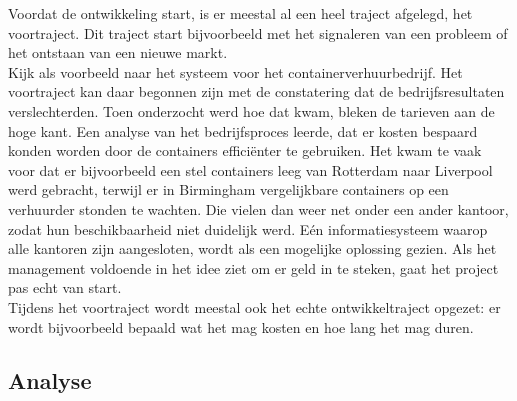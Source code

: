 \documentclass{article}
\begin{document}
	Voordat de ontwikkeling start, is er meestal al een heel traject afgelegd,
	het voortraject. Dit traject start bijvoorbeeld met het signaleren van een
	probleem of het ontstaan van een nieuwe markt. \\
	Kijk als voorbeeld naar het systeem voor het containerverhuurbedrijf.
	Het voortraject kan daar begonnen zijn met de constatering dat de
	bedrijfsresultaten verslechterden. Toen onderzocht werd hoe dat kwam,
	bleken de tarieven aan de hoge kant. Een analyse van het bedrijfsproces
	leerde, dat er kosten bespaard konden worden door de containers
	efficiënter te gebruiken. Het kwam te vaak voor dat er bijvoorbeeld een
	stel containers leeg van Rotterdam naar Liverpool werd gebracht, terwijl
	er in Birmingham vergelijkbare containers op een verhuurder stonden te
	wachten. Die vielen dan weer net onder een ander kantoor, zodat hun
	beschikbaarheid niet duidelijk werd. Eén informatiesysteem waarop
	alle kantoren zijn aangesloten, wordt als een mogelijke oplossing gezien.
	Als het management voldoende in het idee ziet om er geld in te steken,
	gaat het project pas echt van start. \\
	Tijdens het voortraject wordt meestal ook het echte ontwikkeltraject
	opgezet: er wordt bijvoorbeeld bepaald wat het mag kosten en hoe lang
	het mag duren. \\
	
	\subsection{Analyse}
	
\end{document}
